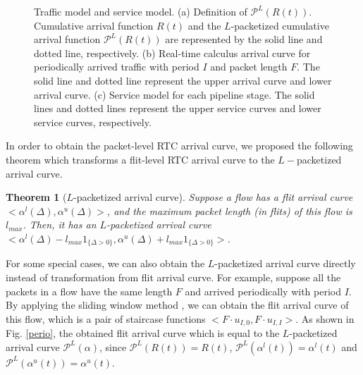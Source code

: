 \documentclass[preprint]{elsarticle}
\newtheorem{thm}{Theorem}
\def\QED{\mbox{\rule[0pt]{1.3ex}{1.3ex}}}
\begin{document}
\begin{figure}
  \caption{Traffic model and service model. (a) Definition of $\mathcal{P}^L(R(t))$. Cumulative arrival function $R(t)$ and the $L$-packetized cumulative arrival function $\mathcal{P}^L(R(t))$ are represented by the solid line and dotted line, respectively. (b) Real-time calculus arrival curve for periodically arrived traffic with period $I$ and packet length $F$. The solid line and dotted line represent the upper arrival curve and lower arrival curve. (c) Service model for each pipeline stage. The solid lines and dotted lines represent the upper service curves and lower service curves, respectively.}\label{ac}
\end{figure}

In order to obtain the packet-level RTC arrival curve, we proposed the following theorem which transforms a flit-level RTC arrival curve to the $L-$packetized arrival curve.

\begin{thm}[$L$-packetized arrival curve]\label{pktac}
Suppose a flow has a flit arrival curve $<\alpha^l(\Delta),\alpha^u(\Delta)>$, and the maximum packet length (in flits) of this flow is $l_{max}$. Then, it has an $L$-packetized arrival curve $<\alpha^l(\Delta)-l_{max}1_{\{\Delta>0\}},\alpha^u(\Delta)+l_{max}1_{\{\Delta>0\}}>$.
\end{thm}

For some special cases, we can also obtain the $L$-packetized arrival curve directly instead of transformation from flit arrival curve. For example, suppose all the packets in a flow have the same length $F$ and arrived periodically with period $I$. By applying the sliding window method \cite{1253607}, we can obtain the flit arrival curve of this flow, which is a pair of staircase functions $<F\cdot u_{I,0},F\cdot u_{I,I}>$. As shown in Fig. \ref{perio}, the obtained flit arrival curve which is equal to the $L$-packetized arrival curve $\mathcal{P}^L(\alpha)$, since $\mathcal{P}^L(R(t))=R(t)$, $\mathcal{P}^L(\alpha^l(t))=\alpha^l(t)$ and $\mathcal{P}^L(\alpha^u(t))=\alpha^u(t)$.
\end{document}
